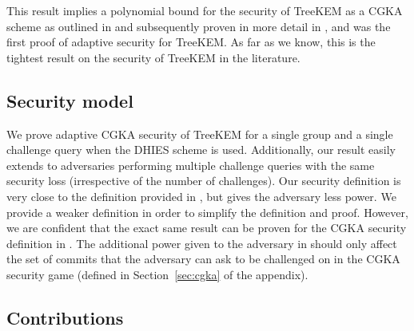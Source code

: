 This result implies a polynomial bound for the security of TreeKEM as a CGKA scheme as outlined in \cite[Theorem 4]{ttkem} and subsequently proven in more detail in \cite[Theorem 12]{modular-group-messaging}, and was the first proof of adaptive security for TreeKEM. As far as we know, this is the tightest result on the security of TreeKEM in the literature.

\subsection{Security model}

We prove adaptive CGKA security of TreeKEM for a single group and a single challenge query when the DHIES scheme is used. Additionally, our result easily extends to adversaries performing multiple challenge queries with the same security loss (irrespective of the number of challenges). Our security definition is very close to the definition provided in \cite[Section 4.1.2]{modular-group-messaging}, but gives the adversary less power. We provide a weaker definition in order to simplify the definition and proof. However, we are confident that the exact same result can be proven for the CGKA security definition in \cite{modular-group-messaging}. The additional power given to the adversary in \cite{modular-group-messaging} should only affect the set of commits that the adversary can ask to be challenged on in the CGKA security game (defined in Section~\ref{sec:cgka} of the appendix).

\subsection{Contributions}

